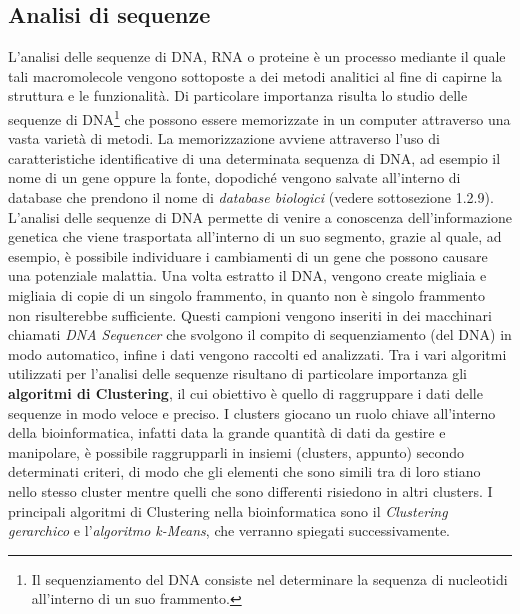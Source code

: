 \subsection{Analisi di sequenze}
L'analisi delle sequenze di DNA, RNA o proteine è un processo mediante il quale tali macromolecole vengono sottoposte a dei metodi analitici al fine di capirne la struttura e le funzionalità.
\newline
Di particolare importanza risulta lo studio delle sequenze di DNA\footnote{Il sequenziamento del DNA consiste nel determinare la sequenza di nucleotidi all'interno di un suo frammento.} che possono essere memorizzate in un computer attraverso una vasta varietà di metodi.
La memorizzazione avviene attraverso l'uso di caratteristiche identificative di una determinata sequenza di DNA, ad esempio il nome di un gene oppure la fonte, dopodiché vengono salvate all'interno di database che prendono il nome di \textit{database biologici} (vedere sottosezione 1.2.9).
\newline
L'analisi delle sequenze di DNA permette di venire a conoscenza dell'informazione genetica che viene trasportata all'interno di un suo segmento, grazie al quale, ad esempio, è possibile individuare i cambiamenti di un gene che possono causare una potenziale malattia.
\newline
Una volta estratto il DNA, vengono create migliaia e migliaia di copie di un singolo frammento, in quanto non è singolo frammento non risulterebbe sufficiente. Questi campioni vengono inseriti in dei macchinari chiamati \textit{DNA Sequencer} che svolgono il compito di sequenziamento (del DNA) in modo automatico, infine i dati vengono raccolti ed analizzati.
\newline
Tra i vari algoritmi utilizzati per l'analisi delle sequenze risultano di particolare importanza gli \textbf{algoritmi di Clustering}, il cui obiettivo è quello di raggruppare i dati delle sequenze in modo veloce e preciso. I clusters giocano un ruolo chiave all'interno della bioinformatica, infatti data la grande quantità di dati da gestire e manipolare, è possibile raggrupparli in insiemi (clusters, appunto) secondo determinati criteri, di modo che gli elementi che sono simili tra di loro stiano nello stesso cluster mentre quelli che sono differenti risiedono in altri clusters. I principali algoritmi di Clustering nella bioinformatica sono il \textit{Clustering gerarchico} e l'\textit{algoritmo k-Means}, che verranno spiegati successivamente.

